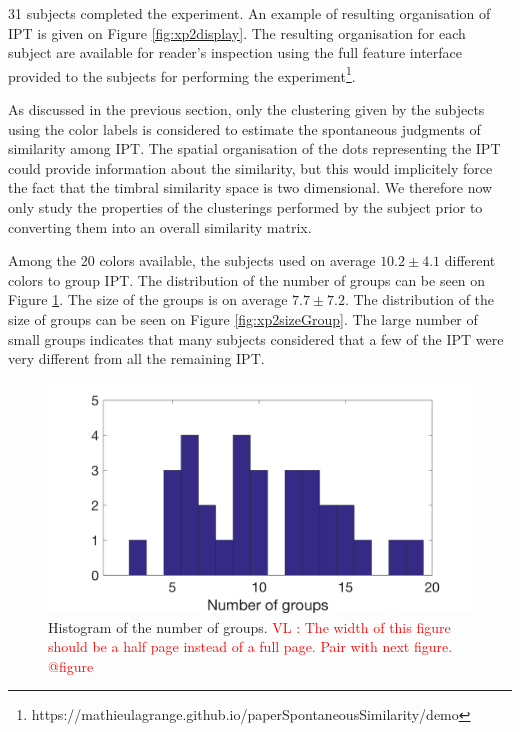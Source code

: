 \documentclass{article}
\newcommand{\ipt}{IPT\xspace}
\newcommand{\vl}[1]{\textcolor{red}{VL : #1}}
\begin{document}
31 subjects completed the experiment. An example of resulting organisation of \ipt is given on Figure \ref{fig:xp2display}. The resulting organisation for each subject are available for reader's inspection using the full feature interface provided to the subjects for performing the experiment\footnote{https://mathieulagrange.github.io/paperSpontaneousSimilarity/demo}.

As discussed in the previous section, only the clustering given by the subjects using the color labels is considered to estimate the spontaneous judgments of similarity among \ipt. The spatial organisation of the dots representing the \ipt could provide information about the similarity, but this would implicitely force the fact that the timbral similarity space is two dimensional. We therefore now only study the properties of the clusterings performed by the subject prior to converting them into an overall similarity matrix.

Among the 20 colors available, the subjects used on average $10.2 \pm  4.1$ different colors to group \ipt. The distribution of the number of groups can be seen on Figure \ref{fig:xp2nbGroup}. The size of the groups is on average $7.7 \pm   7.2$. The distribution of the size of groups can be seen on Figure \ref{fig:xp2sizeGroup}. The large number of small groups indicates that many subjects considered that a few of the \ipt were very different from all the remaining \ipt.

\begin{figure}
\center
\includegraphics[width = \textwidth]{figures/nbc.png}
\caption{Histogram of the number of groups.
\vl{The width of this figure should be a half page instead of a full page. Pair with next figure. @figure}}
\label{fig:xp2nbGroup}
\end{figure}
\end{document}
